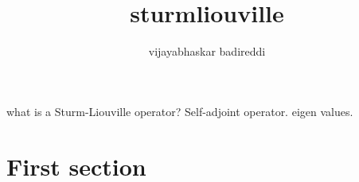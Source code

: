 \documentclass[12pt]{article}
\title{sturmliouville}
\author{vijayabhaskar badireddi}
\begin{document}
what is a Sturm-Liouville operator?
Self-adjoint operator.
eigen values.
\section*{First section}
\end{document}
